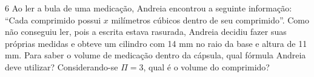 

\num{6} Ao ler a bula de uma medicação, Andreia encontrou a seguinte
informação: ``Cada comprimido possui $x$ milímetros cúbicos dentro de seu comprimido''. Como
não conseguiu ler, pois a escrita estava rasurada, Andreia decidiu fazer
suas próprias medidas e obteve um cilindro com 14 mm no raio da base e altura de 11 mm.
Para saber o volume de medicação dentro da cápsula, qual fórmula Andreia deve utilizar?
Considerando-se $\Pi = 3$, qual é o volume do comprimido?





\vspace{2cm}

